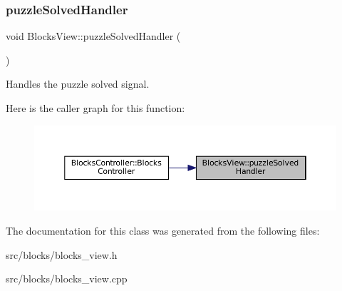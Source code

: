 \subsubsection{\texorpdfstring{puzzleSolvedHandler}{puzzleSolvedHandler}}
{\footnotesize\ttfamily void Blocks\+View\+::puzzle\+Solved\+Handler (\begin{DoxyParamCaption}{ }\end{DoxyParamCaption})\hspace{0.3cm}{\ttfamily [slot]}}



Handles the puzzle solved signal. 

Here is the caller graph for this function\+:
\nopagebreak
\begin{figure}[H]
\begin{center}
\leavevmode
\includegraphics[width=350pt]{class_blocks_view_aac769b83129ef5e37c4ab6c680cc13a1_icgraph}
\end{center}
\end{figure}


The documentation for this class was generated from the following files\+:\begin{DoxyCompactItemize}
\item 
src/blocks/blocks\+\_\+view.\+h\item 
src/blocks/blocks\+\_\+view.\+cpp\end{DoxyCompactItemize}
